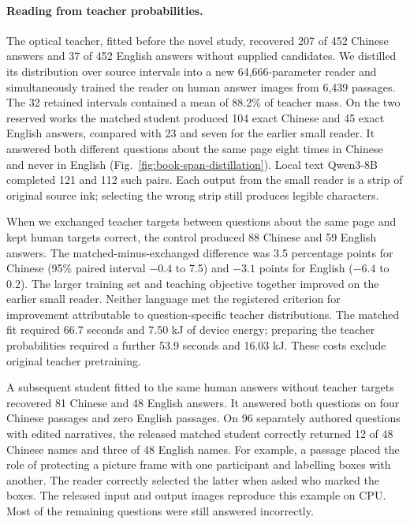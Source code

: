 \paragraph{Reading from teacher probabilities.}
The optical teacher, fitted before the novel study, recovered 207 of 452 Chinese answers and 37 of 452 English answers without supplied candidates. We distilled its distribution over source intervals into a new 64,666-parameter reader and simultaneously trained the reader on human answer images from 6,439 passages. The 32 retained intervals contained a mean of 88.2\% of teacher mass. On the two reserved works the matched student produced 104 exact Chinese and 45 exact English answers, compared with 23 and seven for the earlier small reader. It answered both different questions about the same page eight times in Chinese and never in English (Fig.~\ref{fig:book-span-distillation}). Local text Qwen3-8B completed 121 and 112 such pairs. Each output from the small reader is a strip of original source ink; selecting the wrong strip still produces legible characters.

When we exchanged teacher targets between questions about the same page and kept human targets correct, the control produced 88 Chinese and 59 English answers. The matched-minus-exchanged difference was 3.5 percentage points for Chinese (95\% paired interval $-0.4$ to 7.5) and $-3.1$ points for English ($-6.4$ to 0.2). The larger training set and teaching objective together improved on the earlier small reader. Neither language met the registered criterion for improvement attributable to question-specific teacher distributions. The matched fit required 66.7 seconds and 7.50 kJ of device energy; preparing the teacher probabilities required a further 53.9 seconds and 16.03 kJ. These costs exclude original teacher pretraining.

A subsequent student fitted to the same human answers without teacher targets recovered 81 Chinese and 48 English answers. It answered both questions on four Chinese passages and zero English passages. On 96 separately authored questions with edited narratives, the released matched student correctly returned 12 of 48 Chinese names and three of 48 English names. For example, a passage placed the role of protecting a picture frame with one participant and labelling boxes with another. The reader correctly selected the latter when asked who marked the boxes. The released input and output images reproduce this example on CPU. Most of the remaining questions were still answered incorrectly.
